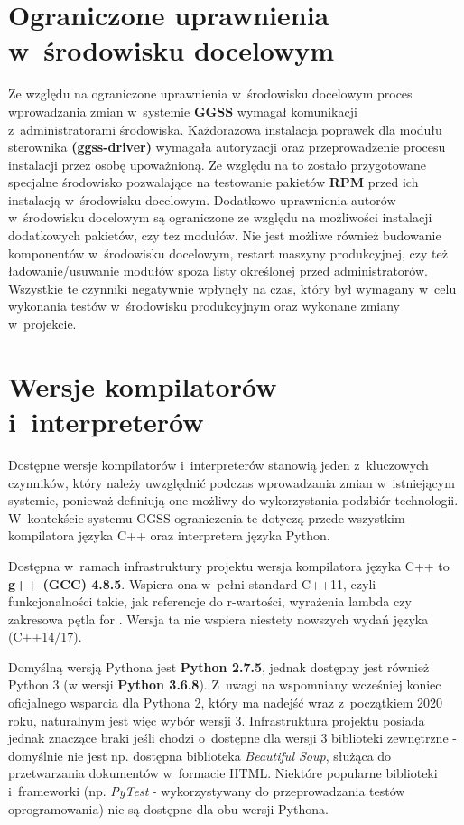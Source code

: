 \section{Ograniczone uprawnienia w~środowisku docelowym}
Ze względu na ograniczone uprawnienia w~środowisku docelowym proces wprowadzania zmian w~systemie \textbf{GGSS} wymagał komunikacji z~administratorami środowiska. Każdorazowa instalacja poprawek dla modułu sterownika \textbf{(ggss-driver)} wymagała autoryzacji oraz przeprowadzenie procesu instalacji przez osobę upoważnioną. Ze względu na to zostało przygotowane specjalne środowisko pozwalające na testowanie pakietów \textbf{RPM} przed ich instalacją w~środowisku docelowym. Dodatkowo uprawnienia autorów w~środowisku docelowym są ograniczone ze względu na możliwości instalacji dodatkowych pakietów, czy tez modułów. Nie jest możliwe również budowanie komponentów w~środowisku docelowym, restart maszyny produkcyjnej, czy też ładowanie/usuwanie modułów spoza listy określonej przed administratorów. Wszystkie te czynniki negatywnie wpłynęły na czas, który był wymagany w~celu wykonania testów w~środowisku produkcyjnym oraz wykonane zmiany w~projekcie.


\section{Wersje kompilatorów i~interpreterów}
Dostępne wersje kompilatorów i~interpreterów stanowią jeden z~kluczowych czynników, który należy uwzględnić podczas wprowadzania zmian w~istniejącym systemie, ponieważ definiują one możliwy do wykorzystania podzbiór technologii. W~kontekście systemu GGSS ograniczenia te dotyczą przede wszystkim kompilatora języka C++ oraz interpretera języka Python. \par

Dostępna w~ramach infrastruktury projektu wersja kompilatora języka C++ to \textbf{g++ (GCC) 4.8.5}. Wspiera ona w~pełni standard C++11, czyli funkcjonalności takie, jak referencje do r-wartości, wyrażenia lambda czy zakresowa pętla for \cite{GCC48}. Wersja ta nie wspiera niestety nowszych wydań języka (C++14/17). \par

Domyślną wersją Pythona jest \textbf{Python 2.7.5}, jednak dostępny jest również Python 3 (w wersji \textbf{Python 3.6.8}). Z~uwagi na wspomniany wcześniej koniec oficjalnego wsparcia dla Pythona 2, który ma nadejść wraz z~początkiem 2020 roku, naturalnym jest więc wybór wersji 3. Infrastruktura projektu posiada jednak znaczące braki jeśli chodzi o~dostępne dla wersji 3 biblioteki zewnętrzne - domyślnie nie jest np. dostępna biblioteka \textit{Beautiful Soup}, służąca do przetwarzania dokumentów w~formacie HTML. Niektóre popularne biblioteki i~frameworki (np. \textit{PyTest} - wykorzystywany do przeprowadzania testów oprogramowania) nie są dostępne dla obu wersji Pythona.

